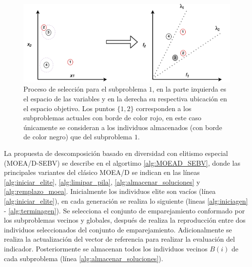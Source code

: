 \begin{figure}[H]
\centering
\scriptsize
\includegraphics[scale=0.25]
{Figures_Chapter4/MOEA_SEBV.png}
\decoRule
\caption{Proceso de selección para el subproblema $1$, en la parte izquierda es el espacio de las variables y en la derecha su respectiva ubicación en el espacio objetivo. Los puntos $\{1, 2\}$ corresponden a los subproblemas actuales con borde de color rojo, en este caso únicamente se consideran a los individuos almacenados (con borde de color negro) que del subproblema $1$.}
\label{fig:Actualizacion_Propuesta_2}
\end{figure}


La propuesta de descomposición basado en diversidad con elitismo especial (MOEA/D-SEBV) se describe en el algortimo \ref{alg:MOEAD_SEBV}, donde las principales variantes del clásico MOEA/D se indican en las líneas \ref{alg:iniciar_elite}, \ref{alg:limipar_pila}, \ref{alg:almacenar_soluciones} y \ref{alg:remplazo_moea}.
%
Inicialmente los individuos elite son vacíos (línea \ref{alg:iniciar_elite}), en cada generación se realiza lo siguiente (lineas \ref{alg:iniciagen} - \ref{alg:terminagen}).
%
Se selecciona el conjunto de emparejamiento conformado por los subproblemas vecinos y globales, después de realiza la reproducción entre dos individuos seleccionados del conjunto de emparejamiento.
%
Adicionalmente se realiza la actualización del vector de referencia para realizar la evaluación del indicador.
%
Posteriormente se almacenan todos los individuos vecinos $B(i)$ de cada subproblema (línea \ref{alg:almacenar_soluciones}).
%

